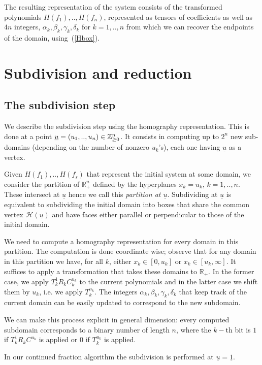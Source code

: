 \documentclass{sig-alternate}
\newcommand{\dott}{{..}}
\def\RR{\mathbb{R}}
\newcommand{\uvec}[1]{\underline{#1}}
\begin{document}
The resulting representation of the system consists of  the transformed
polynomials $H(f_1),\dott,H(f_n)$, represented as tensors of coefficients as
well as $4n$ integers, $\alpha_k,\beta_k,\gamma_k,\delta_k$ for $k=1,\dott,n$
from which we can recover the endpoints of the domain, using~(\ref{Hbox}).


\section{Subdivision and reduction} \label{subdivision-reduction}

\subsection{The subdivision step}

We describe the subdivision step using the homography representation. This is
done at a point $\uvec u=(u_1,\dott,u_n)\in \ZZ^n_{\ge 0}$. It
consists in computing up to $2^n$ new sub-domains (depending on the
number of nonzero $u_k$'s), each one having $\uvec u$ as a vertex.

Given $H(f_1),\dott,H(f_s)$ that represent the initial system at some
domain, we consider the partition of $\RR^n_+$ defined by the
hyperplanes $x_k=u_k$, $k=1,\dott,n$. These intersect at $\uvec u$
hence we call this \emph{partition at $\uvec
  u$}. Subdividing at $\uvec u$ is equivalent to subdividing the
initial domain into boxes that share the common vertex $\mathcal
H(\uvec u)$ and have faces either parallel or perpendicular to those of
the initial domain.

We need to compute a homography representation for every domain in
this partition. The computation is done coordinate wise; observe that
for any domain in this partition we have, for all $k$, either
$x_k\in[0,u_k]$ or $x_k\in[u_k,\infty]$. It suffices to apply a
transformation that takes these domains to $\RR_+$. In the former case,
we apply $T_k^{1}R_kC_k^{u_k}$ to the current polynomials and in the latter
case we shift them by $u_k$, i.e. we apply $T_k^{u_k}$. The integers
$\alpha_k,\beta_k,\gamma_k,\delta_k$ that keep track of the current
domain can be easily updated to correspond to the new subdomain.

We can make this process explicit in general dimension: every computed subdomain
corresponds to a binary number of length $n$, where the $k-$th bit is
$1$ if $T_k^{1}R_kC^{u_k}$ is applied or $0$ if $T_k^{u_k}$ is applied. 

In our continued fraction algorithm the subdivision is performed at $\uvec u=\uvec 1$.
\end{document}
